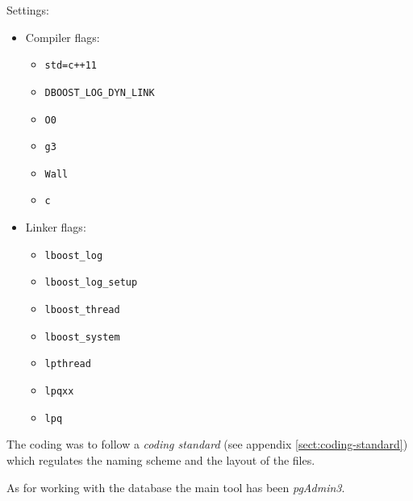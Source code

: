 \documentclass[../main.tex]{subfiles}
\begin{document}
Settings:
\begin{itemize}
    \item Compiler flags:
    \begin{itemize}
        \item \texttt{std=c++11}
        \item \texttt{DBOOST\_LOG\_DYN\_LINK}
        \item \texttt{O0}
        \item \texttt{g3}
        \item \texttt{Wall}
        \item \texttt{c}
    \end{itemize}  
    \item Linker flags: 
    \begin{itemize}
        \item \texttt{lboost\_log}
        \item \texttt{lboost\_log\_setup}
        \item \texttt{lboost\_thread}
        \item \texttt{lboost\_system}
        \item \texttt{lpthread}
        \item \texttt{lpqxx}
        \item \texttt{lpq}
    \end{itemize}
\end{itemize}

\vspace{1em}
\noindent
The coding was to follow a \textit{coding standard} (see appendix \ref{sect:coding-standard}) which regulates the naming scheme and the layout of the files.

As for working with the database the main tool has been \textit{pgAdmin3}.
\end{document}
